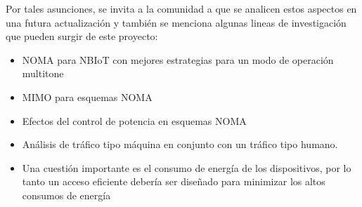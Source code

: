 Por tales asunciones, se invita a la comunidad a que se analicen estos aspectos en una futura actualización y también se menciona algunas lineas de investigación que pueden surgir de este proyecto:

\begin{itemize}
    \item NOMA para NBIoT con mejores estrategias para un modo de operación multitone
    \item MIMO para esquemas NOMA
    \item Efectos del control de potencia en esquemas NOMA
    \item Análisis de tráfico tipo máquina en conjunto con un tráfico tipo humano.
    \item Una cuestión importante es el consumo de energía de los dispositivos, por lo tanto un acceso eficiente debería ser diseñado para minimizar los altos consumos de energía
\end{itemize}


